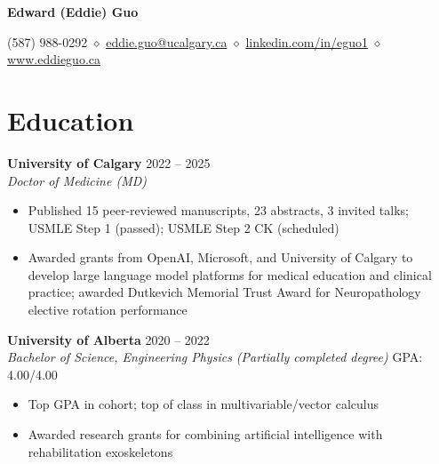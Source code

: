 \documentclass{article}
\begin{document}
\thispagestyle{plain}
\begin{center}
\LARGE \textbf{\textcolor{my_colour}{Edward (Eddie) Guo}} \vspace{.2em}

\normalfont \normalsize
(587) 988-0292 \hspace{.15em} $\diamond$ \hspace{.15em}
\href{mailto:eddie.guo@ucalgary.ca}{eddie.guo@ucalgary.ca}
    \hspace{.15em} $\diamond$ \hspace{.15em}
\href{https://www.linkedin.com/in/eguo1}{linkedin.com/in/eguo1}
    \hspace{.15em} $\diamond$ \hspace{.15em}
\href{https://eddieguo.ca}{www.eddieguo.ca}
\end{center}

\vspace{-1em}


\section*{\textcolor{my_colour}{Education}}
\vspace{-.25em} \hrulefill \vspace{.25em}

\textbf{University of Calgary} \hfill 2022 -- 2025 \\
\textit{Doctor of Medicine (MD)}
\begin{itemize}
    \item Published 15 peer-reviewed manuscripts, 23 abstracts, 3 invited talks; USMLE Step 1 (passed); USMLE Step 2 CK (scheduled)
    \item Awarded grants from OpenAI, Microsoft, and University of Calgary to develop large language model platforms for medical education and clinical practice; awarded Dutkevich Memorial Trust Award for Neuropathology elective rotation performance
\end{itemize} \vspace{1em}

\textbf{University of Alberta} \hfill 2020 -- 2022 \\
\textit{Bachelor of Science, Engineering Physics (Partially completed degree)} \hfill GPA: 4.00/4.00
\begin{itemize}
    \item Top GPA in cohort; top of class in multivariable/vector calculus
    \item Awarded research grants for combining artificial intelligence with rehabilitation exoskeletons
\end{itemize} \vspace{1em}
\end{document}
